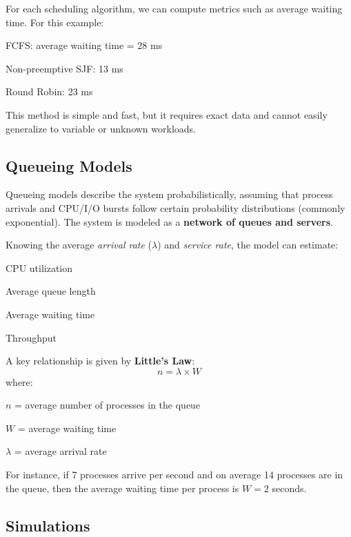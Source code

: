 For each scheduling algorithm, we can compute metrics such as average waiting time.  
For this example:
\begin{compactitemize}
    \item FCFS: average waiting time = 28 ms
    \item Non-preemptive SJF: 13 ms
    \item Round Robin: 23 ms
\end{compactitemize}

This method is simple and fast, but it requires exact data and cannot easily generalize to variable or unknown workloads.

\subsection{Queueing Models}

Queueing models describe the system probabilistically, assuming that process arrivals and CPU/I/O bursts follow certain probability distributions (commonly exponential). The system is modeled as a \textbf{network of queues and servers}.

Knowing the average \textit{arrival rate} ($\lambda$) and \textit{service rate}, the model can estimate:
\begin{compactitemize}
    \item CPU utilization
    \item Average queue length
    \item Average waiting time
    \item Throughput
\end{compactitemize}

A key relationship is given by \textbf{Little’s Law}:
\[
n = \lambda \times W
\]
where:
\begin{compactitemize}
    \item $n$ = average number of processes in the queue
    \item $W$ = average waiting time
    \item $\lambda$ = average arrival rate
\end{compactitemize}

For instance, if 7 processes arrive per second and on average 14 processes are in the queue, then the average waiting time per process is $W = 2$ seconds.

\subsection{Simulations}

